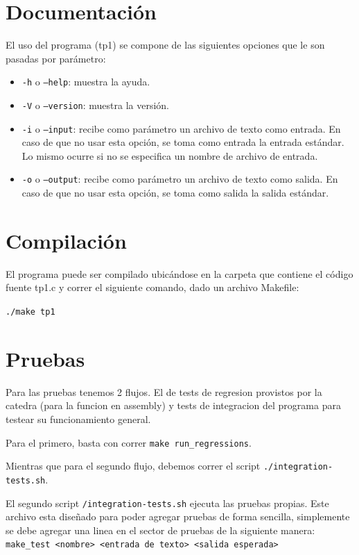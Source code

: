 \documentclass[11pt,a4paper]{article}
\begin{document}
\section{Documentación}
El uso del programa (tp1) se compone de las siguientes opciones que le son pasadas por parámetro:
\begin{itemize}
	\item \texttt{-h} o \texttt{--help}: muestra la ayuda.
	\item \texttt{-V} o \texttt{--version}: muestra la versión.
	\item \texttt{-i} o \texttt{--input}: recibe como parámetro un archivo de texto como entrada. En caso de que no usar esta opción, se toma como entrada la entrada estándar. Lo mismo ocurre si no se especifica un nombre de archivo de entrada.
	\item \texttt{-o} o \texttt{--output}: recibe como parámetro un archivo de texto como salida. En caso de que no usar esta opción, se toma como salida la salida estándar.
\end{itemize}

\section{Compilación}
El programa puede ser compilado ubicándose en la carpeta que contiene el código fuente tp1.c y correr el siguiente comando, dado un archivo Makefile:

\texttt{./make tp1}


\section{Pruebas}
Para las pruebas tenemos 2 flujos. El de tests de regresion provistos por la catedra (para la funcion en assembly) y tests de integracion del programa para testear su funcionamiento general.

Para el primero, basta con correr \texttt{make run_regressions}.

Mientras que para el segundo flujo, debemos correr el script \texttt{./integration-tests.sh}.

El segundo script \texttt{/integration-tests.sh} ejecuta las pruebas propias.
Este archivo esta diseñado para poder agregar pruebas de forma sencilla, simplemente se debe agregar una linea en el sector de pruebas de la siguiente manera:\\

\texttt{make\_test <nombre> <entrada de texto> <salida esperada>}
\end{document}
